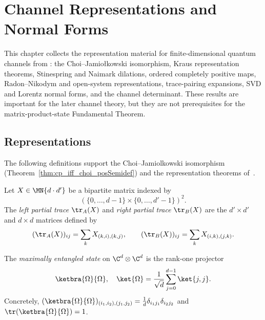 \chapter{Channel Representations and Normal Forms}\label{ch:channel_representations}

This chapter collects the representation material for finite-dimensional quantum
channels from \cite[Chapter~2]{Wolf2012Quantum}: the Choi--Jamio\l{}kowski
isomorphism, Kraus representation theorems, Stinespring and Naimark dilations,
ordered completely positive maps, Radon--Nikodym and open-system
representations, trace-pairing expansions, SVD and Lorentz normal forms, and the
channel determinant. These results are important for the later channel theory,
but they are not prerequisites for the matrix-product-state Fundamental Theorem.

\section{Representations}
\label{sec:representations_infrastructure}

The following definitions support the Choi--Jamiol\-kowski isomorphism
(Theorem~\ref{thm:cp_iff_choi_posSemidef}) and the representation theorems
of~\cite[Chapter~2]{Wolf2012Quantum}.

\begin{definition}\label{def:partial_trace}
    \leanok
    Let $X \in \MN{d \cdot d'}$ be a bipartite matrix indexed by
    \[
        (\{0,\ldots,d-1\} \times \{0,\ldots,d'-1\})^2.
    \]
    The \emph{left partial trace} $\tr_A(X)$ and
    \emph{right partial trace} $\tr_B(X)$ are the
    $d' \times d'$ and $d \times d$ matrices defined by
    \[
        (\tr_A(X))_{ij}
        = \sum_{k} X_{(k,i),(k,j)},
        \qquad
        (\tr_B(X))_{ij}
        = \sum_{k} X_{(i,k),(j,k)}.
    \]
\end{definition}

\begin{definition}\label{def:maximally_entangled}
    \leanok
    The \emph{maximally entangled state} on $\C^d \otimes \C^d$ is the
    rank-one projector
    \[
        \ketbra{\Omega}{\Omega},
        \quad
        \ket{\Omega}
        = \frac{1}{\sqrt{d}} \sum_{j=0}^{d-1} \ket{j,j}.
    \]
    Concretely, $(\ketbra{\Omega}{\Omega})_{(i_1,i_2),(j_1,j_2)}
        = \frac{1}{d} \delta_{i_1 j_1}\delta_{i_2 j_2}$
    and $\tr(\ketbra{\Omega}{\Omega}) = 1$.
\end{definition}

